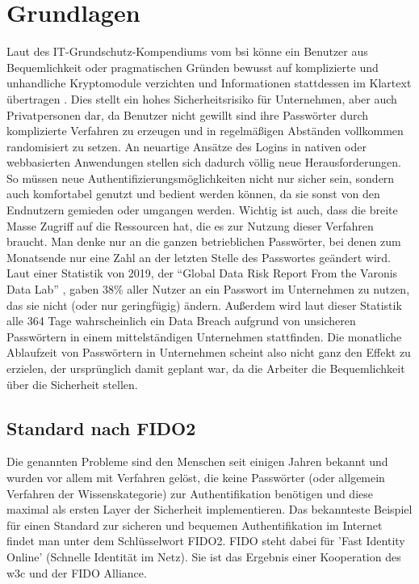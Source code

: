  \chapter{Grundlagen}
Laut des IT-Grundschutz-Kompendiums vom \ac{bsi} könne ein Benutzer aus Bequemlichkeit oder pragmatischen Gründen bewusst auf komplizierte und unhandliche Kryptomodule verzichten und Informationen stattdessen im Klartext übertragen \cite{A5}. Dies stellt ein hohes Sicherheitsrisiko für Unternehmen, aber auch Privatpersonen dar, da Benutzer nicht gewillt sind ihre Passwörter durch komplizierte Verfahren zu erzeugen und in regelmäßigen Abständen vollkommen randomisiert zu setzen. An neuartige Ansätze des Logins in nativen oder webbasierten Anwendungen stellen sich dadurch völlig neue Herausforderungen. So müssen neue Authentifizierungsmöglichkeiten nicht nur sicher sein, sondern auch komfortabel genutzt und bedient werden können, da sie sonst von den Endnutzern gemieden oder umgangen werden. Wichtig ist auch, dass die breite Masse Zugriff auf die Ressourcen hat, die es zur Nutzung dieser Verfahren braucht. Man denke nur an die ganzen betrieblichen Passwörter, bei denen zum Monatsende nur eine Zahl an der letzten Stelle des Passwortes geändert wird. Laut einer Statistik von 2019, der ``Global Data Risk Report From the Varonis Data Lab'' \cite{A33}, gaben 38\% aller Nutzer an ein Passwort im Unternehmen zu nutzen, das sie nicht (oder nur geringfügig) ändern. Außerdem wird laut dieser Statistik alle 364 Tage wahrscheinlich ein Data Breach aufgrund von unsicheren Passwörtern in einem mittelständigen Unternehmen stattfinden. Die monatliche Ablaufzeit von Passwörtern in Unternehmen scheint also nicht ganz den Effekt zu erzielen, der ursprünglich damit geplant war, da die Arbeiter die Bequemlichkeit über die Sicherheit stellen.

\section{Standard nach FIDO2}
Die genannten Probleme sind den Menschen seit einigen Jahren bekannt und wurden vor allem mit Verfahren gelöst, die keine Passwörter (oder allgemein Verfahren der Wissenskategorie) zur Authentifikation benötigen und diese maximal als ersten Layer der Sicherheit implementieren. Das bekannteste Beispiel für einen Standard zur sicheren und bequemen Authentifikation im Internet findet man unter dem Schlüsselwort FIDO2. FIDO steht dabei für 'Fast Identity Online' (Schnelle Identität im Netz). Sie ist das Ergebnis einer Kooperation des \ac{w3c} und der FIDO Alliance.

